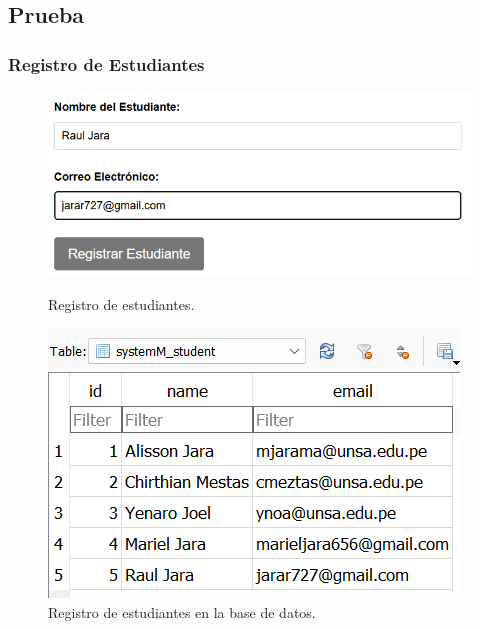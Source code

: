 \documentclass{article}
\begin{document}
\subsection{Prueba}
\subsubsection{Registro de Estudiantes}
\begin{figure}[H]
	\centering
	\begin{minipage}{0.6\textwidth}
		\centering
		\includegraphics[width=\linewidth,keepaspectratio]{img/registerStudent.png}
		\caption{Registro de estudiantes.}
	\end{minipage}\hfill
	\begin{minipage}{0.4\textwidth}
		\centering
		\includegraphics[width=\linewidth,keepaspectratio]{img/registerSBD.png}
		\caption{Registro de estudiantes en la base de datos.}
	\end{minipage}
\end{figure}
\end{document}
